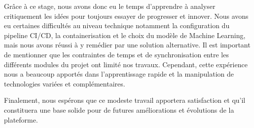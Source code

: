 \vspace{0.5cm}

Grâce à ce stage, nous avons donc eu le temps d'apprendre à analyser critiquement les idées pour toujours essayer de progresser et innover. Nous avons eu certaines difficultés au niveau technique notamment la configuration du pipeline CI/CD, la containerisation et le choix du modèle de Machine Learning, mais nous avons réussi à y remédier par une solution alternative. Il est important de mentionner que les contraintes de temps et de synchronisation entre les différents modules du projet ont limité nos travaux. Cependant, cette expérience nous a beaucoup apportés dans l'apprentissage rapide et la manipulation de technologies variées et complémentaires.

\vspace{0.5cm}

Finalement, nous espérons que ce modeste travail apportera satisfaction et qu'il constituera une base solide pour de futures améliorations et évolutions de la plateforme.

